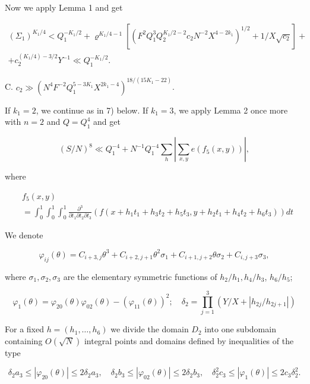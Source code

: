 \documentclass[10pt]{article}
\begin{document}
Now we apply Lemma 1 and get

$$
\begin{array}{r}
\left(\Sigma_{1}\right)^{K_{1} / 4}<Q_{1}^{-K_{1} / 2}+\varrho^{K_{1} / 4-1}\left[\left(F^{2} Q_{1}^{3} Q_{2}^{K_{1} / 2-2} c_{2} N^{-2} X^{4-2 k_{1}}\right)^{1 / 2}+1 / X \sqrt{c_{2}}\right]+ \\
+c_{2}^{\left(K_{1} / 4\right)-3 / 2} Y^{-1} \ll Q_{1}^{-K_{1} / 2} .
\end{array}
$$

C. $c_{2} \gg\left(N^{4} F^{-2} Q_{1}^{5-3 K_{1}} X^{2 k_{1}-4}\right)^{18 /\left(15 K_{1}-22\right)}$.

If $k_{1}=2$, we continue as in 7) below. If $k_{1}=3$, we apply Lemma 2 once more with $n=2$ and $Q=Q_{1}^{4}$ and get

$$
(S / N)^{8} \ll Q_{1}^{-4}+N^{-1} Q_{1}^{-4} \sum_{h}\left|\sum_{x, y} e\left(f_{5}(x, y)\right)\right|,
$$

where

$$
\begin{aligned}
& f_{5}(x, y) \\
& =\int_{0}^{1} \int_{0}^{1} \int_{0}^{1} \frac{\partial^{3}}{\partial t_{1} \partial t_{2} \partial t_{3}}\left(f\left(x+h_{1} t_{1}+h_{3} t_{2}+h_{5} t_{3}, y+h_{2} t_{1}+h_{4} t_{2}+h_{6} t_{3}\right)\right) d t
\end{aligned}
$$

We denote

$$
\varphi_{i j}(\theta)=C_{i+3, j} \theta^{3}+C_{i+2, j+1} \theta^{2} \sigma_{1}+C_{i+1, j+2} \theta \sigma_{2}+C_{i, j+3} \sigma_{3},
$$

where $\sigma_{1}, \sigma_{2}, \sigma_{3}$ are the elementary symmetric functions of $h_{2} / h_{1}, h_{4} / h_{3}$, $h_{6} / h_{5}$;

$$
\varphi_{1}(\theta)=\varphi_{20}(\theta) \varphi_{02}(\theta)-\left(\varphi_{11}(\theta)\right)^{2} ; \quad \delta_{2}=\prod_{j=1}^{3}\left(Y / X+\left|h_{2 j} / h_{2 j+1}\right|\right)
$$

For a fixed $h=\left(h_{1}, \ldots, h_{6}\right)$ we divide the domain $D_{2}$ into one subdomain containing $O(\sqrt{N})$ integral points and domains defined by inequalities of the type

$$
\delta_{2} a_{3} \leqslant\left|\varphi_{20}(\theta)\right| \leqslant 2 \delta_{2} a_{3}, \quad \delta_{2} b_{3} \leqslant\left|\varphi_{02}(\theta)\right| \leqslant 2 \delta_{2} b_{3}, \quad \delta_{2}^{2} c_{3} \leqslant\left|\varphi_{1}(\theta)\right| \leqslant 2 c_{3} \delta_{2}^{2} .
$$
\end{document}
